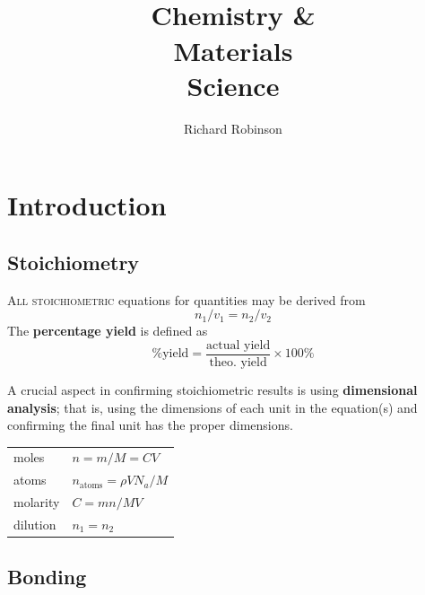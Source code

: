 \documentclass{tufte-book}
\title{\\ Chemistry \& \\ Materials \\ Science}
\author{Richard Robinson}
\renewcommand{\emph}[1]{\textbf{#1}}
\begin{document}
\frontmatter
\maketitle
\setlength{\parindent}{0pt}
\mainmatter


\chapter{Introduction}

\section{Stoichiometry}

\textsc{All stoichiometric} equations for quantities may be derived from \begin{equation}
  n_1/v_1 = n_2/v_2
\end{equation}
The \emph{percentage yield} is defined as \begin{equation}
  \text{\% yield} = \frac{\text{actual yield}}{\text{theo. yield}} \times 100 \%
\end{equation}

A crucial aspect in confirming stoichiometric results is using \emph{dimensional analysis}; that is, using the dimensions of each unit in the equation(s) and confirming the final unit has the proper dimensions.
\begin{center}
  \begin{tabular}{ll}
    moles & $n = m/M = CV$ \\
    atoms & $n_{\mathrm{atoms}} = \rho V N_a / M$ \\
    molarity & $C = mn/MV$ \\
    dilution & $n_1 = n_2$
  \end{tabular}
\end{center}

\section{Bonding}
\end{document}
